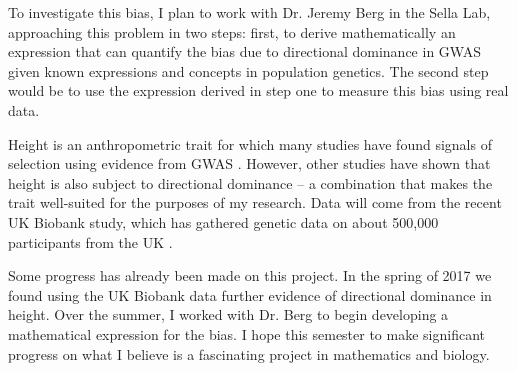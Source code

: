 \documentclass[a4paper,10pt]{article}
\begin{document}
To investigate this bias, I plan to work with Dr. Jeremy Berg in the
Sella Lab, approaching this problem in two steps: first, to derive
mathematically an expression that can quantify the bias due to
directional dominance in GWAS given known expressions and concepts in
population genetics. The second step would be to use the expression
derived in step one to measure this bias using real data.

Height is an anthropometric trait for which many studies have found signals
of selection using
evidence from GWAS \cite{heightselection} . However, other studies have shown that
height is also subject to directional dominance \cite{heightdirectdom}
-- a combination that
makes the trait well-suited for the purposes of my research. Data will
come from the recent UK Biobank study, which has gathered genetic data
on about 500,000 participants from the UK \cite{biobank} .

Some progress has already been made on this project. In the spring of
2017 we found using the UK Biobank data further evidence of
directional dominance in height. Over the summer, I worked
with Dr. Berg to begin developing a mathematical expression for the
bias. I hope this semester to make significant progress on what I
believe is a fascinating project in mathematics and biology. 

\vspace{5mm}



\end{document}
